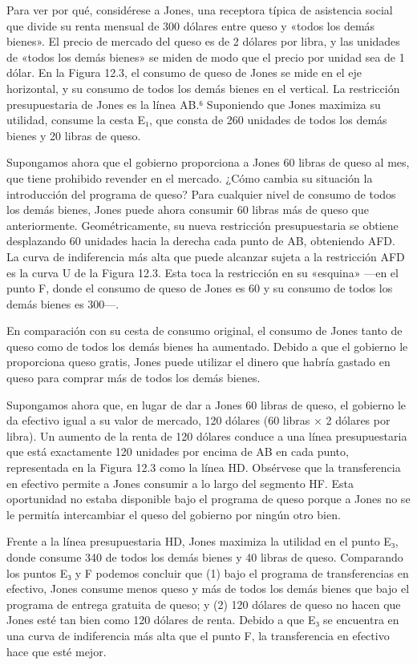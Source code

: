 \documentclass[10pt,a4paper]{article}
\begin{document}
Para ver por qué, considérese a Jones, una receptora típica de asistencia social que divide su renta mensual de 300 dólares entre queso y «todos los demás bienes». El precio de mercado del queso es de 2 dólares por libra, y las unidades de «todos los demás bienes» se miden de modo que el precio por unidad sea de 1 dólar. En la Figura 12.3, el consumo de queso de Jones se mide en el eje horizontal, y su consumo de todos los demás bienes en el vertical. La restricción presupuestaria de Jones es la línea AB.⁶ Suponiendo que Jones maximiza su utilidad, consume la cesta E₁, que consta de 260 unidades de todos los demás bienes y 20 libras de queso.

Supongamos ahora que el gobierno proporciona a Jones 60 libras de queso al mes, que tiene prohibido revender en el mercado. ¿Cómo cambia su situación la introducción del programa de queso? Para cualquier nivel de consumo de todos los demás bienes, Jones puede ahora consumir 60 libras más de queso que anteriormente. Geométricamente, su nueva restricción presupuestaria se obtiene desplazando 60 unidades hacia la derecha cada punto de AB, obteniendo AFD. La curva de indiferencia más alta que puede alcanzar sujeta a la restricción AFD es la curva U de la Figura 12.3. Esta toca la restricción en su «esquina» —en el punto F, donde el consumo de queso de Jones es 60 y su consumo de todos los demás bienes es 300—.

En comparación con su cesta de consumo original, el consumo de Jones tanto de queso como de todos los demás bienes ha aumentado. Debido a que el gobierno le proporciona queso gratis, Jones puede utilizar el dinero que habría gastado en queso para comprar más de todos los demás bienes.

Supongamos ahora que, en lugar de dar a Jones 60 libras de queso, el gobierno le da efectivo igual a su valor de mercado, 120 dólares (60 libras × 2 dólares por libra). Un aumento de la renta de 120 dólares conduce a una línea presupuestaria que está exactamente 120 unidades por encima de AB en cada punto, representada en la Figura 12.3 como la línea HD. Obsérvese que la transferencia en efectivo permite a Jones consumir a lo largo del segmento HF. Esta oportunidad no estaba disponible bajo el programa de queso porque a Jones no se le permitía intercambiar el queso del gobierno por ningún otro bien.

Frente a la línea presupuestaria HD, Jones maximiza la utilidad en el punto E₃, donde consume 340 de todos los demás bienes y 40 libras de queso. Comparando los puntos E₃ y F podemos concluir que (1) bajo el programa de transferencias en efectivo, Jones consume menos queso y más de todos los demás bienes que bajo el programa de entrega gratuita de queso; y (2) 120 dólares de queso no hacen que Jones esté tan bien como 120 dólares de renta. Debido a que E₃ se encuentra en una curva de indiferencia más alta que el punto F, la transferencia en efectivo hace que esté mejor.
\end{document}
